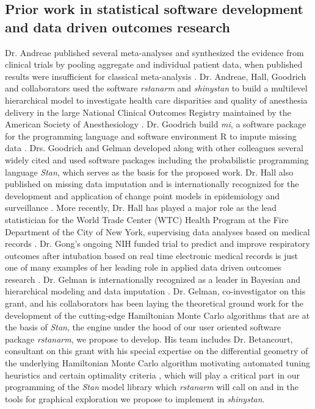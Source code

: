\documentclass[11pt,notitlepage]{article}
\begin{document}
\subsection*{Prior work in statistical software development and data driven outcomes research}
 
Dr. Andreae published several meta-analyses and synthesized the evidence 
from clinical trials by pooling aggregate and individual patient data, when 
published results were insufficient for classical meta-analysis 
\cite{AndreaeJohnsonAbstract2013, Andreae2013, Andreae2015, Carter2015, Atchabahian2015}. Dr. Andreae, Hall, Goodrich and 
collaborators used the software \textit{rstanarm} and \textit{shinystan} to build a multilevel 
hierarchical model to investigate health care disparities and quality of 
anesthesia delivery in the large National Clinical Outcomes Registry maintained 
by the American Society of Anesthesiology \cite{AndreaeWhite2015}. Dr. Goodrich 
build \textit{mi}, a software package for the programming language and 
software environment R to impute missing data \cite{miCRAN}. Drs. Goodrich 
and Gelman developed along with other colleagues several widely cited and used software packages 
including the probabilistic programming language \textit{Stan}\cite{Stan_Software_2014}, 
which serves as the basis for the proposed work. Dr. Hall also published on missing data 
imputation \cite{Hall2009a, Wang_20029935, Wang_20029935} and is internationally 
recognized for the development and application of change point models in 
epidemiology and surveillance \cite{Hall2000, Hall2001, Hall2003bayesian, Hall2009, Hall2015}. 
More recently, Dr. Hall has played a major role as the lead statistician 
for the World Trade Center (WTC) Health Program at the Fire Department 
of the City of New York, supervising data analyses based on medical 
records \cite{Aldrich2010, Hall2015, Zeig-Owens2011}.  
Dr. Gong's ongoing NIH funded trial to predict and improve 
respiratory outcomes after intubation based on real time 
electronic medical records is just one of many examples of her 
leading role in applied data driven outcomes research 
\cite{Gong2005, Gong2010, Gajic2011, Yu_24970344, Kor2014}. 
Dr. Gelman is internationally recognized as a leader in Bayesian and hierarchical 
modeling and data imputation 
\cite{Gelman1998notasked, Gelman2001imputation, Hoffman2014, Gelman-Hill_2014}. 
Dr. Gelman, co-investigator on this grant, and his collaborators has been laying the 
theoretical ground work for the development of the cutting-edge Hamiltonian 
Monte Carlo algorithms \cite{Hoffman2014,Stan_Software_2014} 
that are at the basis of \textit{Stan}, the engine 
under the hood of our user oriented software package \textit{rstanarm}, 
we propose to develop. His team includes Dr. Betancourt, 
consultant on this grant with his special expertise on the differential 
geometry of the underlying Hamiltonian Monte Carlo algorithm
motivating automated tuning heuristics and certain optimality criteria 
\cite{BetancourtGeometry2016}, which will play a 
critical part in our programming of the \textit{Stan} model library 
which \textit{rstanarm} will call on and in the tools for graphical exploration
we propose to implement in \textit{shinystan}.
\end{document}
